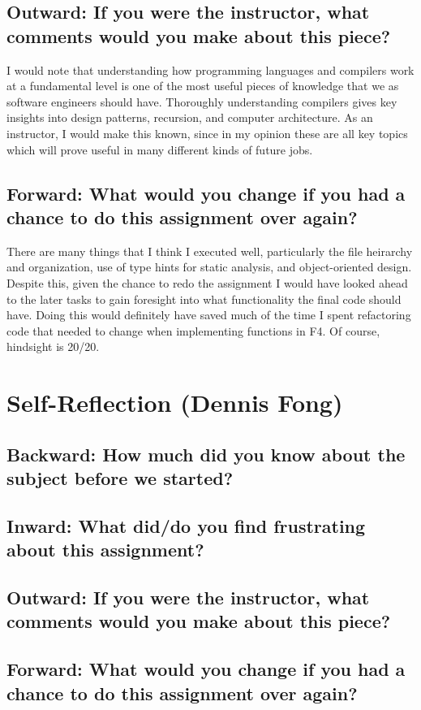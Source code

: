 \documentclass[12pt]{article}
\begin{document}
\subsection*{Outward: If you were the instructor, what comments would you make about this piece?}
I would note that understanding how programming languages and compilers work at a fundamental level is one of the most useful pieces of knowledge that we as software engineers should have. Thoroughly understanding compilers gives key insights into design patterns, recursion, and computer architecture. As an instructor, I would make this known, since in my opinion these are all key topics which will prove useful in many different kinds of future jobs.

\subsection*{Forward: What would you change if you had a chance to do this assignment over again?}
There are many things that I think I executed well, particularly the file heirarchy and organization, use of type hints for static analysis, and object-oriented design. Despite this, given the chance to redo the assignment I would have looked ahead to the later tasks to gain foresight into what functionality the final code should have. Doing this would definitely have saved much of the time I spent refactoring code that needed to change when implementing functions in F4. Of course, hindsight is 20/20.

\pagebreak

\section*{Self-Reflection (Dennis Fong)}
\subsection*{Backward: How much did you know about the subject before we started?}
\subsection*{Inward: What did/do you find frustrating about this assignment?}
\subsection*{Outward: If you were the instructor, what comments would you make about this piece?}
\subsection*{Forward: What would you change if you had a chance to do this assignment over again?}
\end{document}
